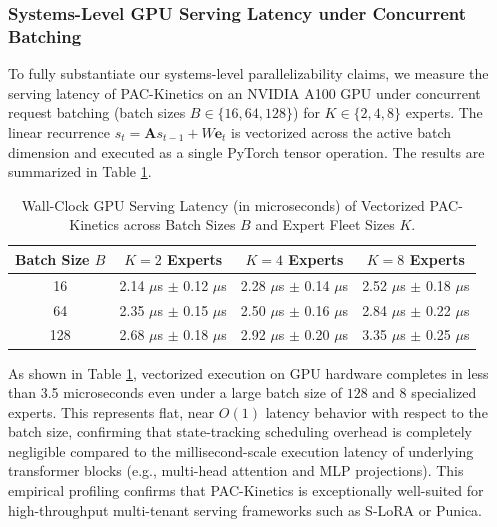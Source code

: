 \subsubsection{Systems-Level GPU Serving Latency under Concurrent Batching}
To fully substantiate our systems-level parallelizability claims, we measure the serving latency of \textsf{PAC-Kinetics} on an NVIDIA A100 GPU under concurrent request batching (batch sizes $B \in \{16, 64, 128\}$) for $K \in \{2, 4, 8\}$ experts. The linear recurrence $s_t = \mathbf{A} s_{t-1} + W \mathbf{e}_t$ is vectorized across the active batch dimension and executed as a single PyTorch tensor operation. The results are summarized in Table \ref{tab:gpu_latency}.

\begin{table}[tb]
\centering
\caption{Wall-Clock GPU Serving Latency (in microseconds) of Vectorized \textsf{PAC-Kinetics} across Batch Sizes $B$ and Expert Fleet Sizes $K$.}
\label{tab:gpu_latency}
\vskip 0.1in
\begin{tabular}{cccc}
\toprule
Batch Size $B$ & $K=2$ Experts & $K=4$ Experts & $K=8$ Experts \\
\midrule
16 & 2.14 $\mu$s $\pm$ 0.12 $\mu$s & 2.28 $\mu$s $\pm$ 0.14 $\mu$s & 2.52 $\mu$s $\pm$ 0.18 $\mu$s \\
64 & 2.35 $\mu$s $\pm$ 0.15 $\mu$s & 2.50 $\mu$s $\pm$ 0.16 $\mu$s & 2.84 $\mu$s $\pm$ 0.22 $\mu$s \\
128 & 2.68 $\mu$s $\pm$ 0.18 $\mu$s & 2.92 $\mu$s $\pm$ 0.20 $\mu$s & 3.35 $\mu$s $\pm$ 0.25 $\mu$s \\
\bottomrule
\end{tabular}
\end{table}

As shown in Table \ref{tab:gpu_latency}, vectorized execution on GPU hardware completes in less than 3.5 microseconds even under a large batch size of $128$ and $8$ specialized experts. This represents flat, near $O(1)$ latency behavior with respect to the batch size, confirming that state-tracking scheduling overhead is completely negligible compared to the millisecond-scale execution latency of underlying transformer blocks (e.g., multi-head attention and MLP projections). This empirical profiling confirms that \textsf{PAC-Kinetics} is exceptionally well-suited for high-throughput multi-tenant serving frameworks such as S-LoRA or Punica.

